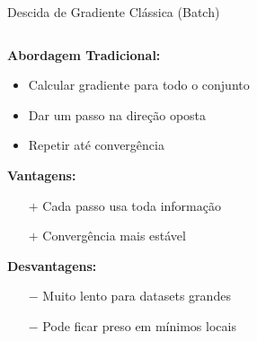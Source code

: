 \documentclass[xcolor=dvipsnames,t,aspectratio=169]{beamer}
\newcommand{\highlight}[1]{{\color{nes_dark_orange} #1}}
\begin{document}
\begin{frame}[c]{Descida de Gradiente Clássica (Batch)}
    \begin{columns}[c]
        \begin{column}{0.55\textwidth}
            \textbf{Abordagem Tradicional:}
            \begin{itemize}
                \item Calcular gradiente para \highlight{todo o conjunto}
                \item Dar um passo na direção oposta
                \item Repetir até convergência
            \end{itemize}
            
            \vspace{0.5cm}
            \textbf{Vantagens:}
            \begin{itemize}
                \item[$+$] Cada passo usa toda informação
                \item[$+$] Convergência mais estável
            \end{itemize}
            
            \textbf{Desvantagens:}
            \begin{itemize}
                \item[$-$] Muito lento para datasets grandes
                \item[$-$] Pode ficar preso em mínimos locais
            \end{itemize}
        \end{column}
        \begin{column}{0.45\textwidth}
        \end{column}
    \end{columns}
\end{frame}
\end{document}
